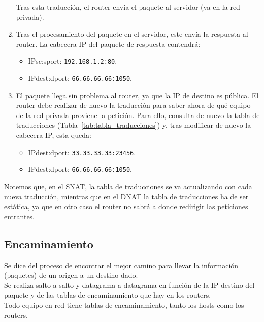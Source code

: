 \begin{ejemplo}
\begin{enumerate}[label=(\arabic*)]
        Tras esta traducción, el router envía el paquete al servidor (ya en la red privada).
        
        \item Tras el procesamiento del paquete en el servidor, este envía la respuesta al router. La cabecera IP del paquete de respuesta contendrá:
            \begin{itemize}
                \item {IPsc}:{sport}: \verb|192.168.1.2:80|.
                \item {IPdest}:{dport}: \verb|66.66.66.66:1050|.
            \end{itemize}
        
        \item El paquete llega sin problema al router, ya que la IP de destino es pública. El router debe realizar de nuevo la traducción para saber ahora de qué equipo de la red privada proviene la petición. Para ello, consulta de nuevo la tabla de traducciones (Tabla~\ref{tab:tabla_traducciones}) y, tras modificar de nuevo la cabecera IP, esta queda:
            \begin{itemize}
                \item {IPdest}:{dport}: \verb|33.33.33.33:23456|.
                \item {IPdest}:{dport}: \verb|66.66.66.66:1050|.
            \end{itemize}
    \end{enumerate}

    Notemos que, en el \acrshort{SNAT}, la tabla de traducciones se va actualizando con cada nueva traducción, mientras que en el \acrshort{DNAT} la tabla de traducciones ha de ser estática, ya que en otro caso el router no sabrá a donde redirigir las peticiones entrantes.
\end{ejemplo}

\subsection{Encaminamiento}
Se dice del proceso de encontrar el mejor camino para llevar la información (paquetes) de un origen a un destino dado. \\

Se realiza salto a salto y datagrama a datagrama en función de la IP destino del paquete y de las tablas de encaminamiento que hay en los routers. \\

Todo equipo en red tiene tablas de encaminamiento, tanto los hosts como los routers.

